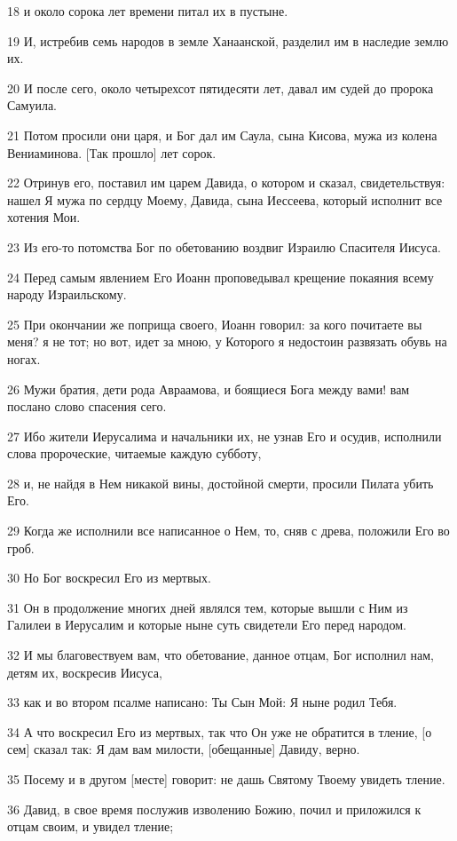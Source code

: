 \par 18 и около сорока лет времени питал их в пустыне.
\par 19 И, истребив семь народов в земле Ханаанской, разделил им в наследие землю их.
\par 20 И после сего, около четырехсот пятидесяти лет, давал им судей до пророка Самуила.
\par 21 Потом просили они царя, и Бог дал им Саула, сына Кисова, мужа из колена Вениаминова. [Так прошло] лет сорок.
\par 22 Отринув его, поставил им царем Давида, о котором и сказал, свидетельствуя: нашел Я мужа по сердцу Моему, Давида, сына Иессеева, который исполнит все хотения Мои.
\par 23 Из его-то потомства Бог по обетованию воздвиг Израилю Спасителя Иисуса.
\par 24 Перед самым явлением Его Иоанн проповедывал крещение покаяния всему народу Израильскому.
\par 25 При окончании же поприща своего, Иоанн говорил: за кого почитаете вы меня? я не тот; но вот, идет за мною, у Которого я недостоин развязать обувь на ногах.
\par 26 Мужи братия, дети рода Авраамова, и боящиеся Бога между вами! вам послано слово спасения сего.
\par 27 Ибо жители Иерусалима и начальники их, не узнав Его и осудив, исполнили слова пророческие, читаемые каждую субботу,
\par 28 и, не найдя в Нем никакой вины, достойной смерти, просили Пилата убить Его.
\par 29 Когда же исполнили все написанное о Нем, то, сняв с древа, положили Его во гроб.
\par 30 Но Бог воскресил Его из мертвых.
\par 31 Он в продолжение многих дней являлся тем, которые вышли с Ним из Галилеи в Иерусалим и которые ныне суть свидетели Его перед народом.
\par 32 И мы благовествуем вам, что обетование, данное отцам, Бог исполнил нам, детям их, воскресив Иисуса,
\par 33 как и во втором псалме написано: Ты Сын Мой: Я ныне родил Тебя.
\par 34 А что воскресил Его из мертвых, так что Он уже не обратится в тление, [о сем] сказал так: Я дам вам милости, [обещанные] Давиду, верно.
\par 35 Посему и в другом [месте] говорит: не дашь Святому Твоему увидеть тление.
\par 36 Давид, в свое время послужив изволению Божию, почил и приложился к отцам своим, и увидел тление;

